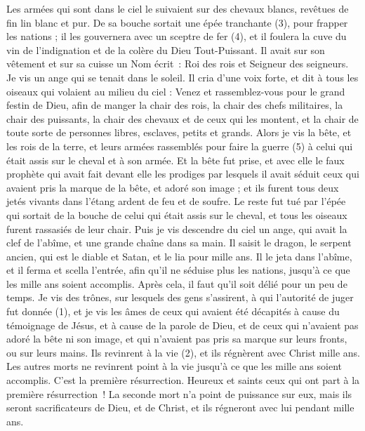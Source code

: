 \begin{multicols}{2}
Les armées qui sont dans le ciel le suivaient sur des chevaux blancs, revêtues de fin lin blanc et pur.
De sa bouche sortait une épée tranchante (3), pour frapper les nations ; il les gouvernera avec un sceptre de fer (4), et il foulera la cuve du vin de l'indignation et de la colère du Dieu Tout-Puissant.
Il avait sur son vêtement et sur sa cuisse un Nom écrit : Roi des rois et Seigneur des seigneurs.
Je vis un ange qui se tenait dans le soleil. Il cria d’une voix forte, et dit à tous les oiseaux qui volaient au milieu du ciel : Venez et rassemblez-vous pour le grand festin de Dieu,
afin de manger la chair des rois, la chair des chefs militaires, la chair des puissants, la chair des chevaux et de ceux qui les montent, et la chair de toute sorte de personnes libres, esclaves, petits et grands.
Alors je vis la bête, et les rois de la terre, et leurs armées rassemblés pour faire la guerre (5) à celui qui était assis sur le cheval et à son armée.
Et la bête fut prise, et avec elle le faux prophète qui avait fait devant elle les prodiges par lesquels il avait séduit ceux qui avaient pris la marque de la bête, et adoré son image ; et ils furent tous deux jetés vivants dans l'étang ardent de feu et de soufre.
Le reste fut tué par l'épée qui sortait de la bouche de celui qui était assis sur le cheval, et tous les oiseaux furent rassasiés de leur chair.
\VerseOne{}Puis je vis descendre du ciel un ange, qui avait la clef de l'abîme, et une grande chaîne dans sa main.
Il saisit le dragon, le serpent ancien, qui est le diable et Satan, et le lia pour mille ans.
Il le jeta dans l'abîme, et il ferma et scella l’entrée, afin qu'il ne séduise plus les nations, jusqu'à ce que les mille ans soient accomplis. Après cela, il faut qu'il soit délié pour un peu de temps.
Je vis des trônes, sur lesquels des gens s'assirent, à qui l'autorité de juger fut donnée (1), et je vis les âmes de ceux qui avaient été décapités à cause du témoignage de Jésus, et à cause de la parole de Dieu, et de ceux qui n'avaient pas adoré la bête ni son image, et qui n'avaient pas pris sa marque sur leurs fronts, ou sur leurs mains. Ils revinrent à la vie (2), et ils régnèrent avec Christ mille ans.
Les autres morts ne revinrent point à la vie jusqu'à ce que les mille ans soient accomplis. C'est la première résurrection.
Heureux et saints ceux qui ont part à la première résurrection ! La seconde mort n'a point de puissance sur eux, mais ils seront sacrificateurs de Dieu, et de Christ, et ils régneront avec lui pendant mille ans.

\end{multicols}
